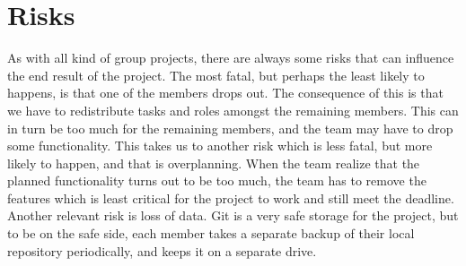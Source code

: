 \documentclass{article}
\begin{document}
\section*{Risks}
As with all kind of group projects, there are always some risks that can influence the end result of the project. The most fatal, but perhaps the least likely to happens, is that one of the members drops out. The consequence of this is that we have to redistribute tasks and roles amongst the remaining members. This can in turn be too much for the remaining members, and the team may have to drop some functionality. This takes us to another risk which is less fatal, but more likely to happen, and that is overplanning. When the team realize that the planned functionality turns out to be too much, the team has to remove the features which is least critical for the project to work and still meet the deadline.
Another relevant risk is loss of data. Git is a very safe storage for the project, but to be on the safe side, each member takes a separate backup of their local repository periodically, and keeps it on a separate drive.
\end{document}
